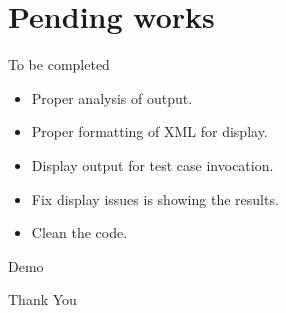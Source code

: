\documentclass{beamer}
\begin{document}
\section{Pending works}
\begin{frame}{To be completed}{}
	\begin{itemize}
		\item Proper analysis of output.
		\item Proper formatting of XML for display.
		\item Display output for test case invocation.
		\item Fix display issues is showing the results.
		\item Clean the code.
	\end{itemize}
\end{frame}

\begin{frame}{}
	\begin{block}{}
		\begin{center}
			{\LARGE Demo}	
		\end{center}
	\end{block}
	
\end{frame}


\begin{frame}{}
	\begin{block}{}
		\begin{center}
			{\LARGE Thank You}	
		\end{center}
	\end{block}
	
\end{frame}
\end{document}
